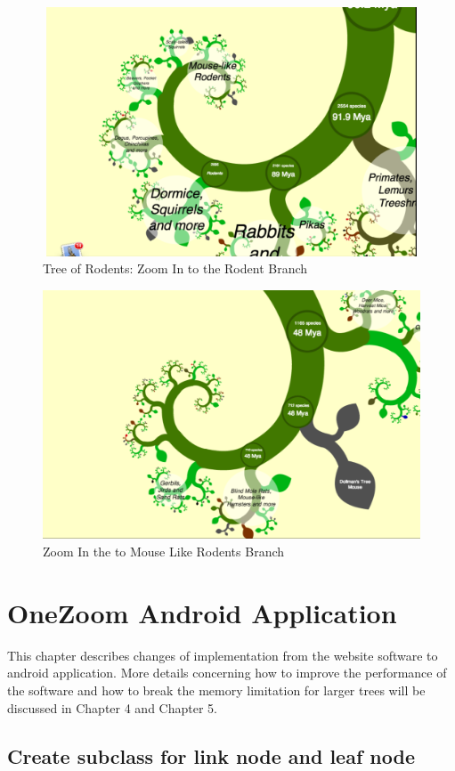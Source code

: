 \documentclass[MSc]{icldt}
\begin{document}
\begin{figure}[H]
  \centering
  \includegraphics [width=12.5cm,height=7.4cm]{Rodent}
  \caption{Tree of Rodents: Zoom In to the Rodent Branch}
  \label{fig:rodent}
\end{figure}

\begin{figure}[H]
  \centering
  \includegraphics [width=12.5cm,height=7.4cm]{MouseLikeRodent}
  \caption{Zoom In the to Mouse Like Rodents Branch}
  \label{fig:mouseLikeRodent}
\end{figure}

\chapter{OneZoom Android Application}

This chapter describes changes of implementation from the website software to android application. More details concerning how to improve the performance of the software and how to break the memory limitation for larger trees will be discussed in Chapter 4 and Chapter 5.

\section{Create subclass for link node and leaf node}
\end{document}

